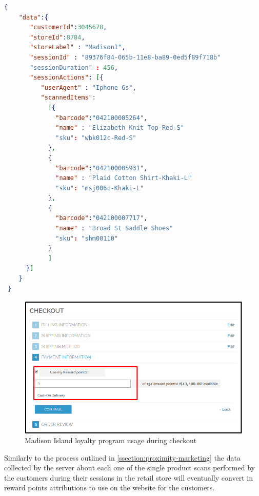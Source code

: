 \vspace{0.5cm}
\begin{lstlisting}[language=json,firstnumber=1]
  {
    "data":{
       "customerId":3045678,
       "storeId":8784,
       "storeLabel" : "Madison1",
       "sessionId" : "89376f84-065b-11e8-ba89-0ed5f89f718b"
       "sessionDuration" : 456,
       "sessionActions": [{
          "userAgent" : "Iphone 6s",
          "scannedItems":
            [{
              "barcode":"042100005264",
              "name" : "Elizabeth Knit Top-Red-S"
              "sku": "wbk012c-Red-S"    
            },
            {
              "barcode":"042100005931",
              "name" : "Plaid Cotton Shirt-Khaki-L"
              "sku": "msj006c-Khaki-L"    
            },
            {
              "barcode":"042100007717",
              "name" : "Broad St Saddle Shoes"
              "sku": "shm00110"    
            }
            ]
      }]
    }
 }
  \end{lstlisting}
\vspace{0.5cm}


\vspace{0.5cm}
\begin{figure}[H]
  \centering
    \includegraphics[width=12cm]{images/loyalty-reward-points.png}
  \caption{Madison Island loyalty program usage during checkout}
  \label{fig:loyalty-points}
\end{figure}
\vspace{0.5cm}

Similarly to the process outlined in \ref{ssection:proximity-marketing} the data collected by the server about each one of the single product scans performed by the customers during their sessions in the retail store will eventually convert in reward points attributions to use on the website for the customers.  




